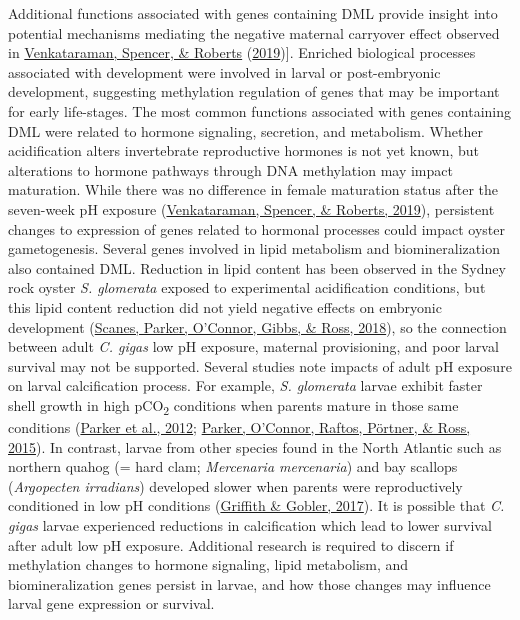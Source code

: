 \documentclass [11pt, proquest] {uwthesis}[2015/03/03]
\begin{document}
Additional functions associated with genes containing DML provide insight into potential mechanisms mediating the negative maternal carryover effect observed in \protect\hyperlink{ref-Venkataraman2019}{Venkataraman, Spencer, \& Roberts} (\protect\hyperlink{ref-Venkataraman2019}{2019}){]}. Enriched biological processes associated with development were involved in larval or post-embryonic development, suggesting methylation regulation of genes that may be important for early life-stages. The most common functions associated with genes containing DML were related to hormone signaling, secretion, and metabolism. Whether acidification alters invertebrate reproductive hormones is not yet known, but alterations to hormone pathways through DNA methylation may impact maturation. While there was no difference in female maturation status after the seven-week pH exposure (\protect\hyperlink{ref-Venkataraman2019}{Venkataraman, Spencer, \& Roberts, 2019}), persistent changes to expression of genes related to hormonal processes could impact oyster gametogenesis. Several genes involved in lipid metabolism and biomineralization also contained DML. Reduction in lipid content has been observed in the Sydney rock oyster \emph{S. glomerata} exposed to experimental acidification conditions, but this lipid content reduction did not yield negative effects on embryonic development (\protect\hyperlink{ref-Scanes2018}{Scanes, Parker, O'Connor, Gibbs, \& Ross, 2018}), so the connection between adult \emph{C. gigas} low pH exposure, maternal provisioning, and poor larval survival may not be supported. Several studies note impacts of adult pH exposure on larval calcification process. For example, \emph{S. glomerata} larvae exhibit faster shell growth in high pCO\textsubscript{2} conditions when parents mature in those same conditions (\protect\hyperlink{ref-Parker2012}{Parker et al., 2012}; \protect\hyperlink{ref-Parker2015}{Parker, O'Connor, Raftos, Pörtner, \& Ross, 2015}). In contrast, larvae from other species found in the North Atlantic such as northern quahog (= hard clam; \emph{Mercenaria mercenaria}) and bay scallops (\emph{Argopecten irradians}) developed slower when parents were reproductively conditioned in low pH conditions (\protect\hyperlink{ref-Griffith2017}{Griffith \& Gobler, 2017}). It is possible that \emph{C. gigas} larvae experienced reductions in calcification which lead to lower survival after adult low pH exposure. Additional research is required to discern if methylation changes to hormone signaling, lipid metabolism, and biomineralization genes persist in larvae, and how those changes may influence larval gene expression or survival.
\end{document}
